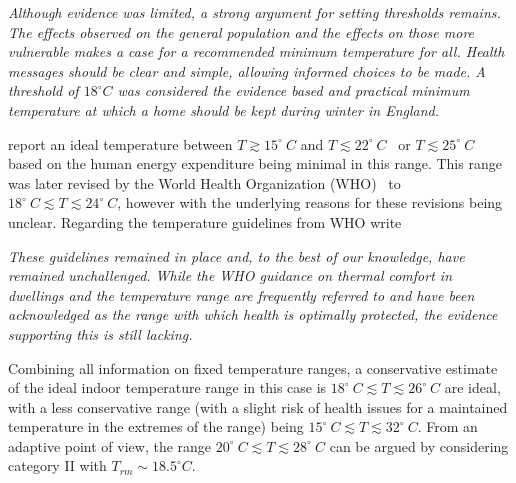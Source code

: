 \documentclass[fleqn,usenatbib,nofootinbib]{revtex4-2}
\begin{document}
	\emph{Although evidence was limited, a strong argument for setting thresholds remains. The effects observed on the general population and the effects on those more vulnerable makes a case for a recommended minimum temperature for all. Health messages should be clear and simple, allowing informed choices to be made. A threshold of $18 ^\circ C$ was considered the evidence based and practical minimum temperature at which a home should be kept during winter in England.}\newline
	
	\citet{Goromosov1968} report an ideal temperature between $T\gtrsim15^\circ \ C$ and $T\lesssim 22^\circ \ C$~\citep{rubner1907} or $T\lesssim 25^\circ \ C$~\citep{marsak1931,slonim1952} based on the human energy expenditure being minimal in this range. This range was later revised by the World Health Organization (WHO)~\citep{world1984} to $18^\circ \ C\lesssim T\lesssim 24^\circ \ C$, however with the underlying reasons for these revisions being unclear. Regarding the temperature guidelines from WHO \citet{Kenny2018} write\newline 
	
	\emph{These guidelines remained in place and, to the best of our knowledge, have remained unchallenged. While the WHO guidance on thermal comfort in dwellings and the temperature range are frequently referred to and have been acknowledged as the range with which health is optimally protected, the evidence supporting this is still lacking.}\newline
	
	Combining all information on fixed temperature ranges, a conservative estimate of the ideal indoor temperature range in this case is $18^\circ \ C\lesssim T\lesssim 26^\circ \ C$ are ideal, with a less conservative range (with a slight risk of health issues for a maintained temperature in the extremes of the range) being $15^\circ \ C\lesssim T\lesssim 32^\circ \ C$. From an adaptive point of view, the range $20^\circ \ C\lesssim T\lesssim 28^\circ \ C$ can be argued by considering category II with $T_{rm} \sim 18.5 ^\circ C$.
\end{document}
